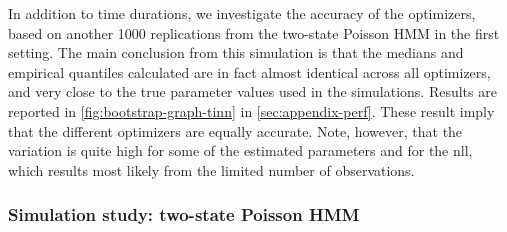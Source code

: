 \documentclass[]{interact}\usepackage[]{graphicx}\usepackage[dvipsnames]{xcolor}
\theoremstyle{plain}%
\theoremstyle{definition}
\theoremstyle{remark}
\begin{document}
In addition to time durations, we investigate the accuracy of the optimizers, based on another 1000 replications from the two-state Poisson HMM in the first setting.
The main conclusion from this simulation is that the medians and empirical quantiles calculated  are in fact almost identical across all optimizers, and very close to the true parameter values used in the simulations. Results are reported in \autoref{fig:bootstrap-graph-tinn} in \autoref{sec:appendix-perf}.
These result imply that the different optimizers are equally accurate. Note, however, that the variation is quite high for some of the estimated parameters and for the nll, which results most likely from the limited number of observations.
   






\subsubsection{Simulation study: two-state Poisson HMM}
\label{sec:results-simu1}
\end{document}
